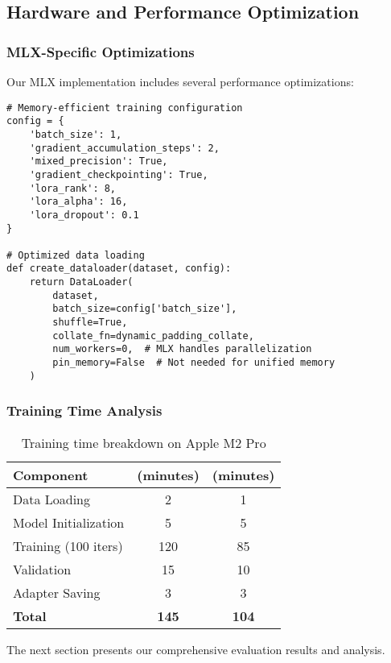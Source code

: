 \subsection{Hardware and Performance Optimization}

\subsubsection{MLX-Specific Optimizations}

Our MLX implementation includes several performance optimizations:

\begin{lstlisting}[caption=MLX training optimization,label=lst:mlx-optimization]
# Memory-efficient training configuration
config = {
    'batch_size': 1,
    'gradient_accumulation_steps': 2,
    'mixed_precision': True,
    'gradient_checkpointing': True,
    'lora_rank': 8,
    'lora_alpha': 16,
    'lora_dropout': 0.1
}

# Optimized data loading
def create_dataloader(dataset, config):
    return DataLoader(
        dataset,
        batch_size=config['batch_size'],
        shuffle=True,
        collate_fn=dynamic_padding_collate,
        num_workers=0,  # MLX handles parallelization
        pin_memory=False  # Not needed for unified memory
    )
\end{lstlisting}

\subsubsection{Training Time Analysis}

\begin{table}[H]
\centering
\begin{tabular}{lcc}
\toprule
Component & \supra{} (minutes) & \zennano{} (minutes) \\
\midrule
Data Loading & 2 & 1 \\
Model Initialization & 5 & 5 \\
Training (100 iters) & 120 & 85 \\
Validation & 15 & 10 \\
Adapter Saving & 3 & 3 \\
\textbf{Total} & \textbf{145} & \textbf{104} \\
\bottomrule
\end{tabular}
\caption{Training time breakdown on Apple M2 Pro}
\label{tab:training-time}
\end{table}

The next section presents our comprehensive evaluation results and analysis.